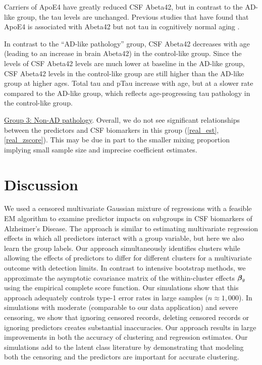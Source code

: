 \documentclass{interact}
\theoremstyle{plain}
\theoremstyle{definition}
\theoremstyle{remark}
\begin{document}
Carriers of ApoE4 have greatly reduced CSF Abeta42, but in contrast to the AD-like group, the tau levels are unchanged. 
Previous studies that have found that ApoE4 is associated with Abeta42 but not tau in cognitively normal aging \citep{Morris2010}. 

In contrast to the ``AD-like pathology'' group, CSF Abeta42 decreases with age (leading to an increase in brain Abeta42) in the control-like group. Since the levels of CSF Abeta42 levels are much lower at baseline in the AD-like group, CSF Abeta42 levels in the control-like group are still higher than the AD-like group at higher ages. Total tau and pTau increase with age, but at a slower rate compared to the AD-like group, which reflects age-progressing tau pathology in the control-like group. 



\underline{Group 3:  Non-AD pathology}. Overall, we do not see significant relationships between the predictors and CSF biomarkers in this group (\cref{real_est}, \cref{real_zscore}). This may be due in part to the smaller mixing proportion implying small sample size and imprecise coefficient estimates. 

\section{Discussion}
\label{sec:discuss}
We used a censored multivariate Gaussian mixture of regressions with a feasible EM algorithm to examine predictor impacts on subgroups in CSF biomarkers of Alzheimer's Disease. The approach is similar to estimating multivariate regression effects in which all predictors interact with a group variable, but here we also learn the group labels. Our approach simultaneously identifies clusters while allowing the effects of predictors to differ for different clusters for a multivariate outcome with detection limits. In contrast to intensive bootstrap methods, we approximate the asymptotic covariance matrix of the within-cluster effects ${\bm \beta}_g$ using the empirical complete score function. Our simulations show that this approach adequately controls type-1 error rates in large samples ($n \approx 1,\!000$). In simulations with moderate (comparable to our data application) and severe censoring, we show that ignoring censored records, deleting censored records or ignoring predictors creates substantial inaccuracies. Our approach results in large improvements in both the accuracy of clustering and regression estimates. Our simulations add to the latent class literature by demonstrating that modeling both the censoring and the predictors are important for accurate clustering. 
\end{document}
